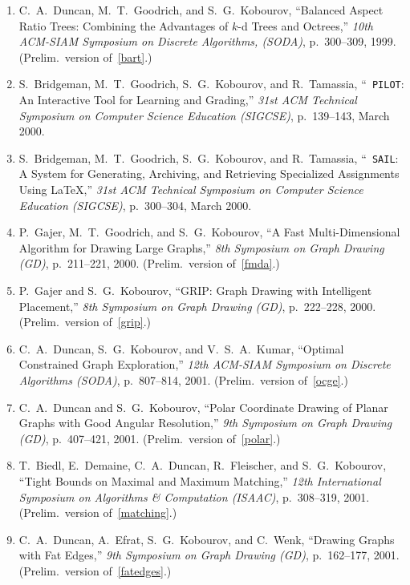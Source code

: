 \documentclass[10pt]{article}
\begin{document}
\begin{description}
\begin{enumerate}
\item 
C.~A.~Duncan, M.~T.~Goodrich, and S.~G.~Kobourov, ``Balanced Aspect
Ratio Trees: Combining the Advantages of $k$-d Trees and
\mbox{Octrees},'' {\em 10th ACM-SIAM Symposium on Discrete
Algorithms, (SODA)}, p.~300--309, 1999. (Prelim.~version of~\ref{bart}.)

\item 
S.~Bridgeman, M.~T.~Goodrich, S.~G.~Kobourov, and R.~Tamassia, ``{\tt
PILOT}: An Interactive Tool for Learning and Grading,'' {\em 31st
ACM Technical Symposium on Computer Science Education (SIGCSE)},
p.~139--143, March 2000.

\item 
S.~Bridgeman, M.~T.~Goodrich, S.~G.~Kobourov, and R.~Tamassia, ``{\tt
SAIL}: A System for Generating, Archiving, and Retrieving Specialized
Assignments Using \LaTeX,'' {\em 31st ACM Technical Symposium on
Computer Science Education (SIGCSE)}, p.~300--304, March 2000.

\item 
P.~Gajer, M.~T.~Goodrich, and S.~G.~Kobourov, ``A Fast
Multi-Dimensional Algorithm for Drawing Large Graphs,'' {\em 8th
Symposium on Graph Drawing (GD)}, p.~211--221, 2000. (Prelim.~version of~\ref{fmda}.)

\item
P.~Gajer and S.~G.~Kobourov, ``GRIP: Graph Drawing with Intelligent
Placement,'' {\em 8th Symposium on Graph Drawing (GD)}, p.~222--228, 2000. (Prelim.~version of~\ref{grip}.)

\item 
C.~A.~Duncan, S.~G.~Kobourov, and V.~S.~A.~Kumar, ``Optimal
Constrained Graph Exploration,'' {\em 12th ACM-SIAM Symposium on
Discrete Algorithms (SODA)}, p.~807--814, 2001. (Prelim.~version of~\ref{ocge}.)


\item 
C.~A.~Duncan and S.~G.~Kobourov, ``Polar Coordinate Drawing of Planar
Graphs with Good Angular Resolution,'' {\em 9th Symposium on Graph Drawing
(GD)}, p.~407--421, 2001. (Prelim.~version of~\ref{polar}.)

\item 
T.~Biedl, E.~Demaine, C.~A.~Duncan, R.~Fleischer, and S.~G.~Kobourov,
``Tight Bounds on Maximal and Maximum Matching,'' {\em 12th
International Symposium on Algorithms \& Computation (ISAAC)}, p.~308--319, 2001.
(Prelim.~version of~\ref{matching}.)
\item 
C.~A.~Duncan, A.~Efrat, S.~G.~Kobourov, and C.~Wenk, ``Drawing Graphs
with Fat Edges,'' {\em 9th Symposium on Graph Drawing (GD)}, p.~162--177,
2001.
(Prelim.~version of~\ref{fatedges}.)


\end{enumerate}
\end{description}
\end{document}
